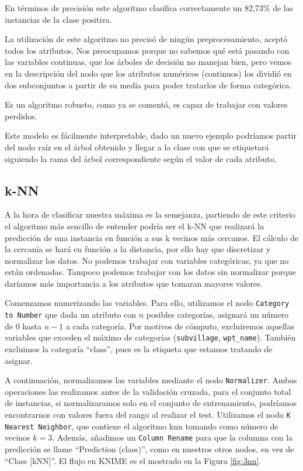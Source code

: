 \documentclass[a4paper, 20pt]{article}
\begin{document}
En términos de precisión este algoritmo clasifica correctamente un 82,73\% de las instancias de la clase positiva.

La utilización de este algoritmo no precisó de ningún preprocesamiento, aceptó todos los atributos. Nos preocupamos porque no sabemos qué está pasando con las variables continuas, que los árboles de decisión no manejan bien, pero vemos en la descripción del nodo que los atributos numéricos (continuos) los dividió en dos subconjuntos a partir de su media para poder tratarlos de forma categórica.

Es un algoritmo robusto, como ya se comentó, es capaz de trabajar con valores perdidos.

Este modelo es fácilmente interpretable, dado un nuevo ejemplo podríamos partir del nodo raíz en el árbol obtenido y llegar a la clase con que se etiquetará siguiendo la rama del árbol correspondiente según el valor de cada atributo.



\subsection{k-NN}
A la hora de clasificar nuestra máxima es la semejanza, partiendo de este criterio el algoritmo más sencillo de entender podría ser el k-NN que realizará la predicción de una instancia en función a sus k vecinos más cercanos. El cálculo de la cercanía se hará en función a la distancia, por ello hay que discretizar y normalizar los datos. No podemos trabajar con variables categóricas, ya que no están ordenadas. Tampoco podemos trabajar con los datos sin normalizar porque daríamos más importancia a los atributos que tomaran mayores valores.

Comenzamos numerizando las variables. Para ello, utilizamos el nodo \texttt{Category to Number} que dada un atributo con $n$ posibles categorías, asignará un número de 0 hasta $n-1$ a cada categoría. Por motivos de cómputo, excluiremos aquellas variables que exceden el máximo de categorías (\texttt{subvillage}, \texttt{wpt\_name}). También excluimos la categoría ``class'', pues es la etiqueta que estamos tratando de asignar.

A continuación, normalizamos las variables mediante el nodo \texttt{Normalizer}. Ambas operaciones las realizamos antes de la validación cruzada, para el conjunto total de instancias, si normalizaramos solo en el conjunto de entrenamiento, podríamos encontrarnos con valores fuera del rango al realizar el test. Utilizamos el nodo \texttt{K Nearest Neighbor}, que contiene el algoritmo knn tomando como número de vecinos $k = 3$. Además, añadimos un \texttt{Column Rename} para que la columna con la predicción se llame ``Prediction (class)'', como en nuestros otros nodos, en vez de ``Class [kNN]''. El flujo en KNIME es el mostrado en la Figura \ref{fig:3nn}.
\end{document}

